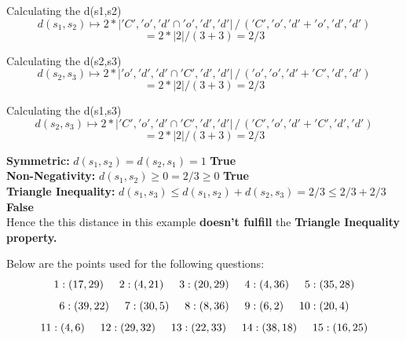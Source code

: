 \begin{enumerate}
      Calculating the d(s1,s2)
      \[d(s_1, s_2) \mapsto 2* |{'C','o','d'} \cap {'o','d','d'}| \, / \, ({'C','o','d'} + {'o','d','d'}) \]
      \quad  \[= 2*|2|/(3+3) = 2/3\]

      Calculating the d(s2,s3) 
      \[d(s_2, s_3) \mapsto 2* |{'o','d','d'} \cap {'C','d','d'}| \, / \, ({'o','o','d'} + {'C','d','d'}) \]
      \quad  \[= 2*|2|/(3+3) = 2/3\]

      Calculating the d(s1,s3)
      \[d(s_2, s_3) \mapsto 2* |{'C','o','d'} \cap {'C','d','d'}| \, / \, ({'C','o','d'} + {'C','d','d'}) \]
      \quad  \[= 2*|2|/(3+3) = 2/3\]

    \textbf{Symmetric:} $d(s_1,s_2) = d(s_2,s_1) = 1$ \textbf{True}\\

    \textbf{Non-Negativity:} $d(s_1,s_2) \geq 0 =  2/3 \geq 0$ \textbf{ True}\\

    \textbf{Triangle Inequality:} $d(s_1,s_3) \leq d(s_1,s_2) + d(s_2,s_3) = 2/3 \leq 2/3+2/3$ \textbf{ False}\\

   Hence the this distance in this example \textbf{doesn't fulfill} the \textbf{Triangle Inequality property.}

    \end{enumerate}

\newpage
{}

  Below are the points used for the following questions:
\[
1: (17, 29) \hspace{5mm}
2: (4, 21) \hspace{5mm}
3: (20, 29) \hspace{5mm}
4: (4, 36) \hspace{5mm}
5: (35, 28)
\]
\[
6: (39, 22) \hspace{5mm}
7: (30, 5) \hspace{5mm}
8: (8, 36) \hspace{5mm}
9: (6, 2) \hspace{5mm}
10: (20, 4)
\]
\[
11: (4, 6) \hspace{5mm}
12: (29, 32) \hspace{5mm}
13: (22, 33) \hspace{5mm}
14: (38, 18) \hspace{5mm}
15: (16, 25)
\]

